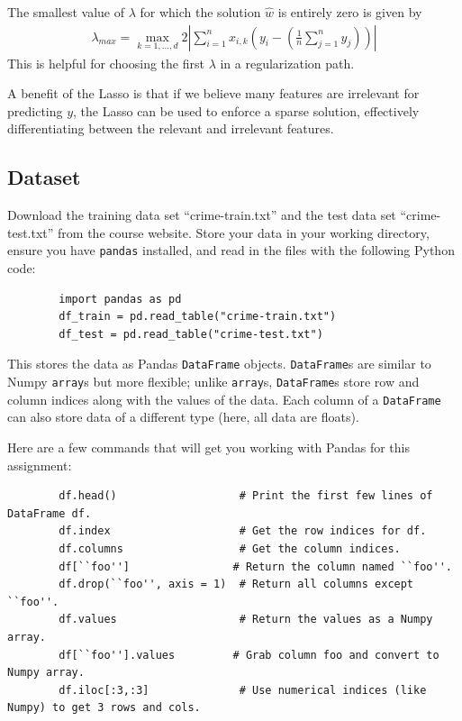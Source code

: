 \documentclass[shortlabels]{article}
\begin{document}
  The smallest value of $\lambda$ for which the solution $\widehat{w}$ is entirely zero is given by
       \begin{align}
           \lambda_{max} = \max_{k=1,\dots,d} 2 \left|\sum_{i=1}^n {x}_{i,k} \left({y}_i - \left(\frac{1}{n} \sum_{j=1}^n y_j \right)\right)\right|\label{eqn:lasso-lambdamax}
       \end{align}
      This is helpful for choosing the first $\lambda$ in a regularization path. 

    A benefit of the Lasso is that if we believe many features are irrelevant for predicting ${y}$, the Lasso can be used to enforce a sparse solution, effectively differentiating between the relevant and irrelevant features.

    \newpage

    \subsection*{Dataset}

    Download the training data set ``crime-train.txt'' and the test data set ``crime-test.txt'' from the course website. Store your data in your working directory, ensure you have \texttt{pandas} installed, and read in the files with the following Python code:

    \begin{verbatim}
        import pandas as pd
        df_train = pd.read_table("crime-train.txt")
        df_test = pd.read_table("crime-test.txt")
    \end{verbatim}

    This stores the data as Pandas \texttt{DataFrame} objects. \texttt{DataFrame}s are similar to Numpy \texttt{array}s but more flexible; unlike \texttt{array}s, \texttt{DataFrame}s store row and column indices along with the values of the data. Each column of a \texttt{DataFrame} can also store data of a different type (here, all data are floats). 

    Here are a few commands that will get you working with Pandas for this assignment:

    \begin{verbatim}
        df.head()                   # Print the first few lines of DataFrame df.
        df.index                    # Get the row indices for df.
        df.columns                  # Get the column indices.
        df[``foo'']                # Return the column named ``foo''.
        df.drop(``foo'', axis = 1)  # Return all columns except ``foo''.
        df.values                   # Return the values as a Numpy array.
        df[``foo''].values         # Grab column foo and convert to Numpy array.
        df.iloc[:3,:3]              # Use numerical indices (like Numpy) to get 3 rows and cols.
    \end{verbatim}
\end{document}
